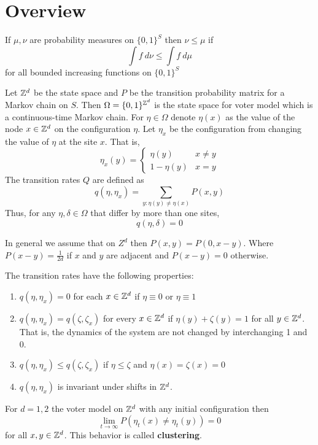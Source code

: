 \section{Overview}

\begin{defn} \cite{steif91}
If $\mu, \nu$ are probability measures on $\{0,1\}^S$ then $\nu \leq \mu$ if
$$
\int f~d\nu \leq \int f~d\mu
$$
for all bounded increasing functions on $\{0,1\}^S$
\end{defn}

\begin{defn} \cite{Liggett2002}
Let $\mathbb{Z}^d$ be the state space and $P$ be the transition probability matrix for a Markov chain on $S$.
Then $\Omega = \{0,1\}^{\mathbb{Z}^d}$ is the state space for voter model which is a continuous-time Markov chain.
For $\eta \in \Omega$ denote $\eta(x)$ as the value of the node $x \in \mathbb{Z}^d$ on the configuration $\eta$.
Let $\eta_x$ be the configuration from changing the value of $\eta$ at the site $x$. That is,
$$
\eta_x(y) = \begin{cases}
    \eta(y) & x \not = y\\
    1 - \eta(y) & x = y
\end{cases}
$$
The transition rates $Q$ are defined as
$$
q(\eta, \eta_x) = \sum_{y : \eta(y) \not = \eta(x)} P(x,y)
$$
Thus, for any $\eta, \delta \in \Omega$ that differ by more than one sites,
$$
q(\eta, \delta) = 0
$$

In general we assume that on $Z^d$ then $P(x,y) = P(0, x - y)$. Where $P(x- y) = \frac{1}{2d}$ if $x$ and $y$ are adjacent and $P(x-y) = 0$ otherwise.

The transition rates have the following properties:
\begin{enumerate}
    \item $q(\eta, \eta_x) = 0$ for each $x \in \mathbb{Z}^d$ if $\eta \equiv 0$ or $\eta \equiv 1$
    \item $q(\eta, \eta_x) = q(\zeta, \zeta_x)$ for every $x \in \mathbb{Z}^d$ if $\eta(y) + \zeta(y) = 1$ for all $y \in \mathbb{Z}^d$. That is, the dynamics of the system are not changed by interchanging 1 and 0.
    \item $q(\eta, \eta_x) \leq q(\zeta, \zeta_x)$ if $\eta \leq \zeta$ and $\eta(x) = \zeta(x) = 0$
    \item $q(\eta, \eta_x)$ is invariant under shifts in $\mathbb{Z}^d$.
\end{enumerate}
\end{defn}

\begin{theorem}
For $d = 1,2$ the voter model on $\mathbb{Z}^d$ with any initial configuration then
$$
\lim_{t \to \infty} P(\eta_t(x) \not = \eta_t(y)) = 0
$$
for all $x,y \in \mathbb{Z}^d$.
This behavior is called \textbf{clustering}.
\end{theorem}

